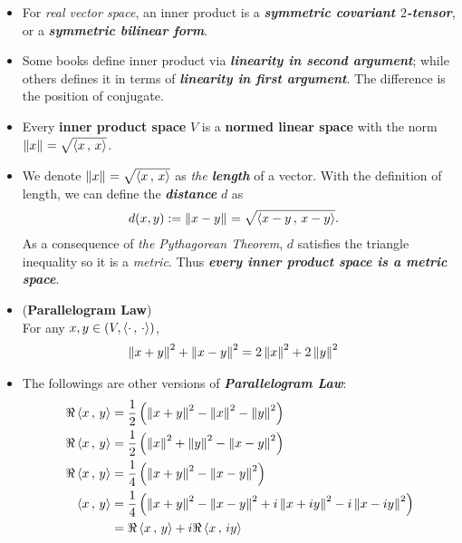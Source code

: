 \documentclass[11pt]{article}
\begin{document}
\begin{itemize}
\item \begin{remark}
For \emph{real vector space}, an inner product is a \emph{\textbf{symmetric covariant $2$-tensor}}, or a \emph{\textbf{symmetric bilinear form}}.
\end{remark}

\item \begin{remark}
Some books \citep{reed1980methods} define inner product via \emph{\textbf{linearity in second argument}}; while others \citep{kreyszig1989introductory, luenberger1997optimization, conway2019course} defines it in terms of \emph{\textbf{linearity in first argument}}. The difference is the position of conjugate.
\end{remark}

\item \begin{proposition}
Every \textbf{inner product space} $V$ is a \textbf{normed linear space} with the norm $\left\|x\right\|_{} = \sqrt{\left\langle x\,,\, x \right\rangle}$.
\end{proposition}

\item \begin{remark}
We denote $\left\|x\right\|_{} = \sqrt{\left\langle x\,,\, x \right\rangle}$ as \emph{the \textbf{length}} of a vector. With the definition of length, we can define the \emph{\textbf{distance}} $d$ as 
\begin{align*}
d(x, y) &:= \left\|x - y\right\|_{} = \sqrt{\left\langle x - y\,,\, x - y \right\rangle}.
\end{align*} As a consequence of \emph{the Pythagorean Theorem}, $d$ satisfies the triangle inequality so it is a \emph{metric}. Thus \emph{\textbf{every inner product space is a metric space}}. 
\end{remark}

\item \begin{proposition} (\textbf{Parallelogram Law}) \\
For any $x, y \in (V, \left\langle \cdot\,,\, \cdot \right\rangle)$, 
\begin{align*}
\left\|x + y\right\|_{}^2 + \left\|x- y\right\|_{}^2 &= 2 \left\|x\right\|_{}^2 + 2\left\|y\right\|_{}^2
\end{align*}
\end{proposition}

\item \begin{remark}
The followings are other versions of \textbf{\emph{Parallelogram Law}}:
\begin{align*}
\Re \left\langle x\,,\, y \right\rangle &= \frac{1}{2}\left(\left\|x+y\right\|_{}^2 - \left\|x\right\|_{}^2 - \left\|y\right\|_{}^2\right)\\
\Re \left\langle x\,,\, y \right\rangle &= \frac{1}{2}\left(\left\|x\right\|_{}^2 + \left\|y\right\|_{}^2 - \left\|x-y\right\|_{}^2 \right)\\
\Re \left\langle x\,,\, y \right\rangle &= \frac{1}{4}\left(\left\|x+y\right\|_{}^2 - \left\|x - y\right\|_{}^2 \right) \\
\left\langle x\,,\, y \right\rangle &= \frac{1}{4}\left(\left\|x+y\right\|_{}^2 - \left\|x - y\right\|_{}^2 + i\left\|x+ iy\right\|_{}^2 - i \left\|x - iy\right\|_{}^2\right) \\
&= \Re \left\langle x\,,\, y \right\rangle + i \Re \left\langle x\,,\, iy \right\rangle
\end{align*}
\end{remark}


\end{itemize}
\end{document}
